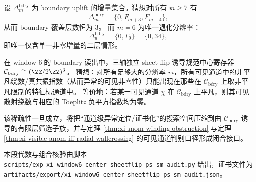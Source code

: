 \begin{conjecture}[dyadic boundary uplift 层数在 \(m=6\) 的唯一退化]\label{conj:xi-window6-bdry-uplift-unique-degeneration}
设 \(\Delta_m^{\mathrm{bdry}}\) 为 boundary uplift 的增量集合。猜想对所有 \(m\ge 7\) 有
\[
\Delta_m^{\mathrm{bdry}}=\{0,F_{m+3},F_{m+4}\},
\]
从而 boundary 覆盖层数恒为 \(3\)。
而 \(m=6\) 为唯一退化分辨率：
\[
\Delta_6^{\mathrm{bdry}}=\{0,F_9\}=\{0,34\},
\]
即唯一仅含单一非零增量的二层情形。
\end{conjecture}

\begin{conjecture}\label{conj:xi-anomaly-resonance-channel-sparsity-controlled-by-boundary-parity}
在 window-\(6\) 的 boundary 读出中，三轴独立 sheet-flip 诱导规范中心寄存器
\(\mathcal C_{\mathrm{bdry}}\cong(\ZZ/2\ZZ)^3\)。
猜想：对所有足够大的分辨率 \(m\)，所有可见通道中的非平凡绕数/真共振指数（从而异常的可见非零性）只能出现在那些在 \(\mathcal C_{\mathrm{bdry}}\) 上取非平凡限制的特征标通道中。
等价地：若某一可见通道 \(\overline\chi\) 在 \(\mathcal C_{\mathrm{bdry}}\) 上平凡，则其可见散射绕数与相应的 Toeplitz 负平方指数均为零。
\par
该稀疏性一旦成立，将把“通道级异常定位/证书化”的搜索空间压缩到由 \(\mathcal C_{\mathrm{bdry}}\) 诱导的有限层筛选子族，并与定理 \ref{thm:xi-anom-winding-obstruction} 与定理 \ref{thm:xi-visible-anom-iff-radial-wallcrossing} 的可见通道判别口径形成闭合接口。
\end{conjecture}

\begin{remark}[可复现核验脚本]\label{rem:xi-window6-center-sheetflip-ps-sm-audit-script}
本段代数与组合核验由脚本
\texttt{scripts/exp\_xi\_window6\_center\_sheetflip\_ps\_sm\_audit.py}
给出，证书文件为
\texttt{artifacts/export/xi\_window6\_center\_sheetflip\_ps\_sm\_audit.json}。
\end{remark}

